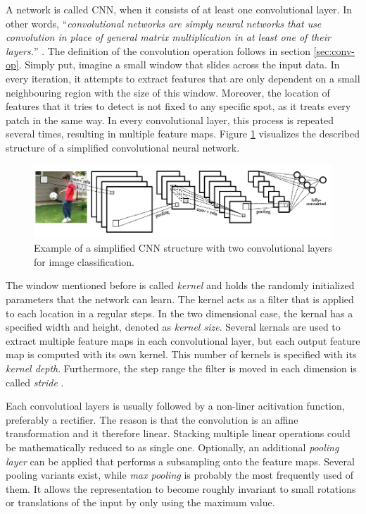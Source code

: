 A network is called CNN, when it consists of at least one convolutional layer. In other words, ``\textit{convolutional networks are simply neural networks that use convolution in place of general matrix multiplication in at least one of their layers.}'' \parencite{deep_learning}. The definition of the convolution operation follows in section \ref{sec:conv-op}. Simply put, imagine a small window that slides across the input data. In every iteration, it attempts to extract features that are only dependent on a small neighbouring region with the size of this window. Moreover, the location of features that it tries to detect is not fixed to any specific spot, as it treats every patch in the same way. In every convolutional layer, this process is repeated several times, resulting in multiple feature maps. Figure \ref{fig:cnn-structure} visualizes the described structure of a simplified convolutional neural network.

\begin{figure}[htpb]
	\centering
	\includegraphics[scale=0.45]{figures/cnn_structure.png}
	\caption[Structure of a CNN]{Example of a simplified CNN structure with two convolutional layers for image classification.} \label{fig:cnn-structure}
\end{figure}

The window mentioned before is called \textit{kernel} and holds the randomly initialized parameters that the network can learn. The kernel acts as a filter that is applied to each location in a regular steps. In the two dimensional case, the kernal has a specified width and height, denoted as \textit{kernel size}. Several kernals are used to extract multiple feature maps in each convolutional layer, but each output feature map is computed with its own kernel. This number of kernels is specified with its \textit{kernel depth}. Furthermore, the step range the filter is moved in each dimension is called \textit{stride} \parencite{conv_guide}.

Each convolutioal layers is usually followed by a non-liner acitivation function, preferably a rectifier. The reason is that the convolution is an affine transformation and it therefore linear. Stacking multiple linear operations could be mathematically reduced to as single one. Optionally, an additional \textit{pooling layer} can be applied that performs a subsampling onto the feature maps. Several pooling variants exist, while \textit{max pooling} is probably the most frequently used of them. It allows the representation to become roughly invariant to small rotations or translations of the input \parencite[p. 343]{deep_learning} by only using the maximum value.


